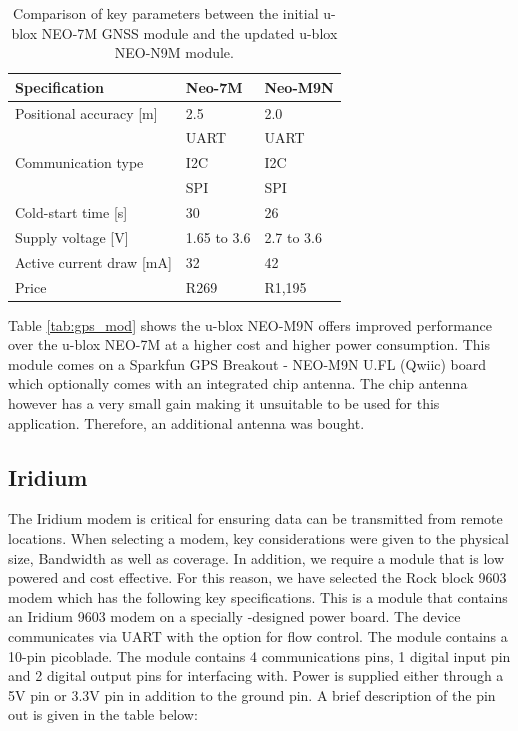 \begin{table}[H]
	\centering
	\caption{Comparison of key parameters between the initial u-blox NEO-7M GNSS module and the updated u-blox NEO-N9M module.}
	\label{tab:gps_mod}
	\setlength{\extrarowheight}{5pt}
	\begin{tabular}{l l l}
		\hline
		\textbf{Specification} & Neo-7M & Neo-M9N\\
		\hline
		\hline
		Positional accuracy [m] & 2.5  & 2.0 \\
		\hline
		\multirow{3}{*}{Communication type} & UART & UART\\ & I2C & I2C \\ & SPI & SPI\\
		\hline
		Cold-start time [s]& 30 & 26\\
		\hline
		Supply voltage [V] & 1.65 to 3.6 & 2.7 to 3.6\\
		\hline
		Active current draw [mA] & 32 &  42\\
		\hline
		Price & R269 \footnotemark & R1,195\footnotemark\\
		\hline
		\hline
	\end{tabular}
	\label{tab:neo7}
\end{table}
Table \ref{tab:gps_mod} shows the u-blox NEO-M9N offers improved performance  over the u-blox NEO-7M at a higher cost and higher power consumption. This module comes on a Sparkfun GPS Breakout - NEO-M9N U.FL (Qwiic) board which optionally comes with an integrated chip antenna. The chip antenna however has a very small gain making it unsuitable to be used for this application. Therefore, an additional antenna was bought. %

\subsection{Iridium}

The Iridium modem is critical for ensuring data can be transmitted from remote locations. When selecting a modem, key considerations were given to the physical size, Bandwidth as well as coverage. In addition, we require a module that is low powered and cost effective. For this reason, we have selected the Rock block 9603 modem which has the following key specifications. This is a module that contains an Iridium 9603 modem on a specially -designed power board. The device communicates via UART with the option for flow control. The module contains a 10-pin picoblade. The module contains 4 communications pins, 1 digital input pin and 2 digital output pins for interfacing with. Power is supplied either through a 5V pin or 3.3V pin in addition to the ground pin. A brief description of the pin out is given in the table below: 

